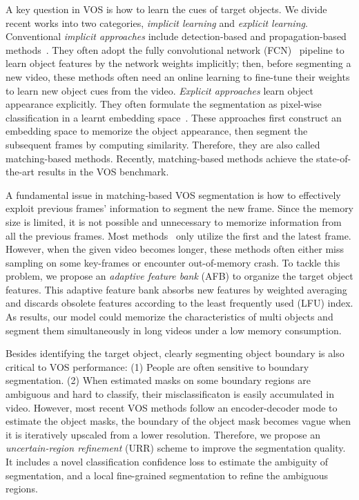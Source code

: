 \documentclass{article}
\begin{document}
A key question in VOS is how to learn the cues of target objects. 
We divide recent works into two categories, \emph{implicit learning} and \emph{explicit learning}. 
Conventional \emph{implicit approaches} include detection-based and propagation-based methods~\cite{caelles2017one, Perazzi2017, hu_maskrnn_2017, voigtlaender17BMVC, bao_cnn_2018,  LucidDataDreaming_CVPR17_workshops, maninis_video_2019}. 
They often adopt the fully convolutional network (FCN)~\cite{long2015fully} pipeline to learn object  features by the network weights implicitly; then, before segmenting a new video, these methods often need an online learning to fine-tune their weights to learn new object cues from the video. 
\emph{Explicit approaches} learn object appearance explicitly. 
They often formulate the segmentation as pixel-wise classification in a learnt embedding space~\cite{voigtlaender2019feelvos, chen2018blazingly, oh_fast_2018, hu2018videomatch, wang_ranet_2019, lin_agss-vos_2019, johnander2019generative, oh_video_2019, liang2020waternet}.  
These approaches first construct an embedding space to memorize the object appearance, then segment the subsequent frames by computing similarity. Therefore, they are also called matching-based methods.
Recently, matching-based methods achieve the state-of-the-art results in the VOS benchmark. 

A fundamental issue in matching-based VOS segmentation is how to effectively exploit previous frames' information to segment the new frame. 
Since the memory size is limited, it is not possible and unnecessary to memorize information from all the previous frames. 
Most methods~\cite{oh_fast_2018, wang_ranet_2019, voigtlaender2019feelvos, lin_agss-vos_2019} only utilize the first and the latest frame.
However, when the given video becomes longer, these methods often either miss sampling on some key-frames or encounter out-of-memory crash. 
To tackle this problem, we propose an \emph{adaptive feature bank} (AFB) to organize the target object features. 
This adaptive feature bank absorbs new features by weighted averaging and discards obsolete features according to the least frequently used (LFU) index. 
As results, our model could memorize the characteristics of multi objects and segment them simultaneously in long videos under a low memory consumption.

Besides identifying the target object, clearly segmenting object boundary is also critical to VOS performance: 
(1) People are often sensitive to boundary segmentation. 
(2) When estimated masks on some boundary regions are ambiguous and hard to classify, their misclassificaton is easily accumulated in video.  
However, most recent VOS methods follow an encoder-decoder mode to estimate the object masks, the boundary of the object mask becomes vague when it is iteratively upscaled from a lower resolution. 
Therefore, we propose an \emph{uncertain-region refinement} (URR) scheme to improve the segmentation quality.
It includes a novel classification confidence loss to estimate the ambiguity of segmentation, and a local fine-grained segmentation to refine the ambiguous regions.
\end{document}
